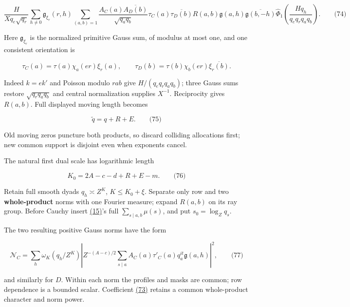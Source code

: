 \label{cf:eq:D.10}

\[
\frac{H}{Xq_e\sqrt{q_r}}
\sum_{h\ne0}\mathfrak g_{\xi_r}(r,h)
\sum_{(a,b)=1}\frac{A_C(a)\overline{A_D(b)}}{\sqrt{q_aq_b}}
\tau_C(a)\overline{\tau_D(b)}R(a,b)
\mathfrak g(a,h)\overline{\mathfrak g(b,-h)}
\widehat\Phi_1\!\left(\frac{Hq_h}{q_eq_rq_aq_b}\right).
\qquad\text{(74)}
\]

Here \(\mathfrak g_{\xi_r}\) is the normalized primitive Gauss sum, of modulus at most one, and one consistent orientation is

\[
\tau_C(a)=\tau(a)\chi_a(er)\xi_r(a),\qquad
\tau_D(b)=\tau(b)\chi_b(er)\overline{\xi_r(b)}.
\]

Indeed \(k=ek'\) and Poisson modulo \(rab\) give \(H/(q_eq_rq_aq_b)\); three Gauss sums restore \(\sqrt{q_rq_aq_b}\) and central normalization supplies \(X^{-1}\). Reciprocity gives \(R(a,b)\). Full displayed moving length becomes

\hypertarget{cf:eq:D.11}{}

\label{cf:eq:D.11}

\[
\widetilde q=q+R+E.
\qquad\text{(75)}
\]

Old moving zeros puncture both products, so discard colliding allocations first; new common support is disjoint even when exponents cancel.

The natural first dual scale has logarithmic length

\hypertarget{cf:eq:D.12}{}

\label{cf:eq:D.12}

\[
K_0=2A-c-d+R+E-m.
\qquad\text{(76)}
\]

Retain full smooth dyads \(q_h\asymp Z^K\), \(K\le K_0+\xi\). Separate only row and two \textbf{whole-product} norms with one Fourier measure; expand \(R(a,b)\) on its ray group. Before Cauchy insert \protect\hyperlink{cf:eq:A.19}{(15)}'s full \(\sum_{s\mid a,b}\mu(s)\), and put \(s_0=\log_Zq_s\).

The two resulting positive Gauss norms have the form

\hypertarget{cf:eq:D.13}{}

\label{cf:eq:D.13}

\[
\mathcal N_C=
\sum_h\omega_K(q_h/Z^K)
\left|Z^{-(A-c)/2}\sum_{s\mid a}A_C(a)\tau'_C(a)q_a^{it}\mathfrak g(a,h)\right|^2,
\qquad\text{(77)}
\]

and similarly for \(D\). Within each norm the profiles and masks are common; row dependence is a bounded scalar. Coefficient \protect\hyperlink{cf:eq:D.9}{(73)} retains a common whole-product character and norm power.

